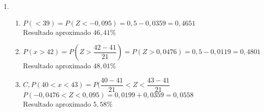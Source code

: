 \documentclass[a4paper, 12pt]{article}
\begin{document}
\begin{enumerate}
\begin{enumerate}
\end{enumerate}	
\item \begin{enumerate}
\item $P(< 39) = P(Z < - 0,095) = 0,5 - 0,0359 = 0,4651$ \\
Resultado aproximado $46,41 \%$ \\

\item $P(x > 42) = P(Z > \dfrac{42-41}{21}) = P(Z > 0,0476) = 0,5 - 0,0119 = 0,4801$
Resultado aproximado $48,01 \%$ \\

\item $C, P(40 < x < 43) = P(\dfrac{40 - 41}{21} < Z < \dfrac{43 - 41}{21}$ \\
$P(-0,0476 < Z < 0,095) = 0,0199 + 0,0359 = 0,0558$ \\
Resultado aproximado $5,58 \%$ \\


\end{enumerate}
	 
\end{enumerate}

 
\end{document}
